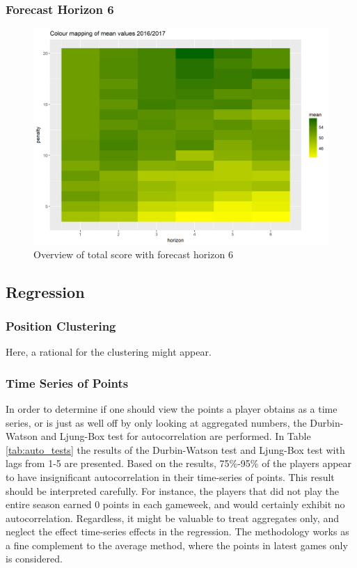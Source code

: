 \subsubsection{Forecast Horizon 6}

\begin{figure}[H]
    \centering
    \includegraphics[scale=0.55]{fig/chapter_6/paramter_choice_6.png}
    \caption{Overview of total score with forecast horizon 6}
\label{fig:parameters_f_hor_6}    
\end{figure}


\subsection{Regression}

\subsubsection{Position Clustering}

Here, a rational for the clustering might appear.

\subsubsection{Time Series of Points}

In order to determine if one should view the points a player obtains as a time series, or is just as well off by only looking at aggregated numbers, the Durbin-Watson and Ljung-Box test for autocorrelation are performed. In Table \ref{tab:auto_tests} the results of the Durbin-Watson test and Ljung-Box test with lags from 1-5 are presented. Based on the results, 75\%-95\% of the players appear to have insignificant autocorrelation in their time-series of points. This result should be interpreted carefully. For instance, the players that did not play the entire season earned 0 points in each gameweek, and would certainly exhibit no autocorrelation. Regardless, it might be valuable to treat aggregates only, and neglect the effect time-series effects in the regression. The methodology works as a fine complement to the average method, where the points in latest games only is considered.

